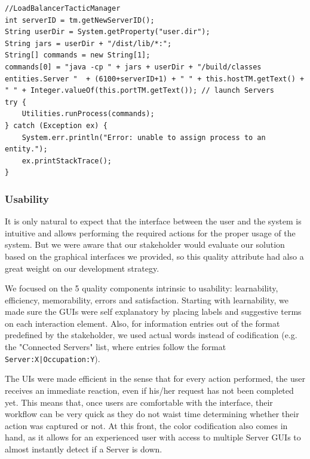 \documentclass[12pt]{article}
\begin{document}
\begin{lstlisting}
//LoadBalancerTacticManager
int serverID = tm.getNewServerID();
String userDir = System.getProperty("user.dir");
String jars = userDir + "/dist/lib/*:";
String[] commands = new String[1];
commands[0] = "java -cp " + jars + userDir + "/build/classes entities.Server "  + (6100+serverID+1) + " " + this.hostTM.getText() + " " + Integer.valueOf(this.portTM.getText()); // launch Servers
try {
    Utilities.runProcess(commands);
} catch (Exception ex) {
    System.err.println("Error: unable to assign process to an entity.");
    ex.printStackTrace();
}
\end{lstlisting}

\subsubsection{Usability} \label{usability}

It is only natural to expect that the interface between the user and the system is intuitive and allows performing the required actions for the proper usage of 
the system.
But we were aware that our stakeholder would evaluate our solution based on the graphical interfaces we provided, so this quality attribute had also a great 
weight on our development strategy.

We focused on the 5 quality components intrinsic to usability: learnability, efficiency, memorability, errors and satisfaction.
Starting with learnability, we made sure the GUIs were self explanatory by placing labels and suggestive terms on each interaction element.
Also, for information entries out of the format predefined by the stakeholder, we used actual words instead of codification (e.g. the "Connected Servers" list,
where entries follow the format \texttt{Server:X|Occupation:Y}).

The UIs were made efficient in the sense that for every action performed, the user receives an immediate reaction, even if his/her request has not been completed yet.
This means that, once users are comfortable with the interface, their workflow can be very quick as they do not waist time determining whether their action was 
captured or not.
At this front, the color codification also comes in hand, as it allows for an experienced user with access to multiple Server GUIs to almost instantly detect 
if a Server is down.
\end{document}

